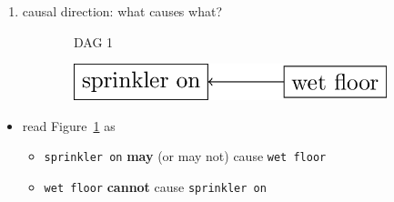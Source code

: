 \documentclass[
  letterpaper,
  DIV=11,
  numbers=noendperiod]{scrartcl}
\providecommand{\tightlist}{%
  \setlength{\itemsep}{0pt}\setlength{\parskip}{0pt}}\usepackage{longtable,booktabs,array}
\begin{document}
\begin{enumerate}
\def\labelenumi{\arabic{enumi}.}
\tightlist
\item
  causal direction: what causes what?
\end{enumerate}

\begin{figure}

\begin{minipage}{0.50\linewidth}

\begin{figure}[H]


\caption{\label{fig-dag-floor1}DAG 1}

\end{figure}%

\end{minipage}%
%
\begin{minipage}{0.50\linewidth}

\begin{figure}[H]

{\centering \includegraphics{_tikzs/dag-floor2.png}

}


\end{figure}%

\end{minipage}%

\end{figure}%

\begin{itemize}
\tightlist
\item
  read Figure~\ref{fig-dag-floor1} as

  \begin{itemize}
  \tightlist
  \item
    \texttt{sprinkler\ on} \textbf{may} (or may not) cause
    \texttt{wet\ floor}
  \item
    \texttt{wet\ floor} \textbf{cannot} cause \texttt{sprinkler\ on}
  \end{itemize}
\end{itemize}
\end{document}
